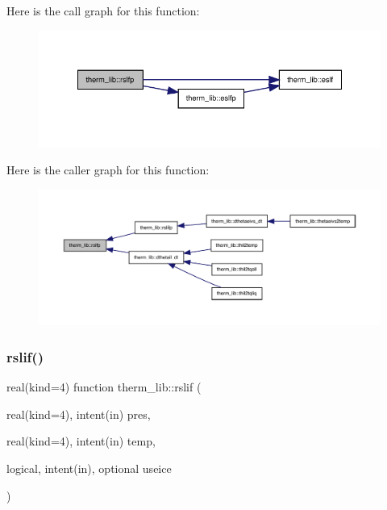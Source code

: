 Here is the call graph for this function\+:
\nopagebreak
\begin{figure}[H]
\begin{center}
\leavevmode
\includegraphics[width=348pt]{namespacetherm__lib_ae0635cd1cd9e80dafd1cb89243c41e02_cgraph}
\end{center}
\end{figure}
Here is the caller graph for this function\+:
\nopagebreak
\begin{figure}[H]
\begin{center}
\leavevmode
\includegraphics[width=350pt]{namespacetherm__lib_ae0635cd1cd9e80dafd1cb89243c41e02_icgraph}
\end{center}
\end{figure}
\mbox{\label{namespacetherm__lib_acc637bbfa1fdd9b523e2b1cf3dce2926}} 
\subsubsection{\texorpdfstring{rslif()}{rslif()}}
{\footnotesize\ttfamily real(kind=4) function therm\+\_\+lib\+::rslif (\begin{DoxyParamCaption}\item[{real(kind=4), intent(in)}]{pres,  }\item[{real(kind=4), intent(in)}]{temp,  }\item[{logical, intent(in), optional}]{useice }\end{DoxyParamCaption})}

